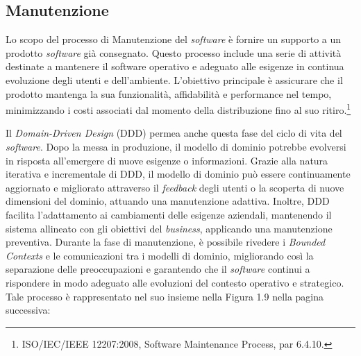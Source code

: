        \subsection{Manutenzione}
        Lo scopo del processo di Manutenzione del \textit{software} è fornire un supporto a un prodotto \textit{software} già consegnato. Questo processo include una serie di attività destinate a mantenere il software operativo e adeguato alle esigenze in continua evoluzione degli utenti e dell'ambiente. L'obiettivo principale è assicurare che il prodotto mantenga la sua funzionalità, affidabilità e performance nel tempo, minimizzando i costi associati dal momento della distribuzione fino al suo ritiro.\footnote{ISO/IEC/IEEE 12207:2008, Software Maintenance Process, par 6.4.10.}

        \vspace{0.2 em}
        \noindent Il \textit{Domain-Driven Design} (DDD) permea anche questa fase del ciclo di vita del \textit{software}. Dopo la messa in produzione, il modello di dominio potrebbe evolversi in risposta all'emergere di nuove esigenze o informazioni. Grazie alla natura iterativa e incrementale di DDD, il modello di dominio può essere continuamente aggiornato e migliorato attraverso il \textit{feedback} degli utenti o la scoperta di nuove dimensioni del dominio, attuando una manutenzione adattiva. Inoltre, DDD facilita l'adattamento ai cambiamenti delle esigenze aziendali, mantenendo il sistema allineato con gli obiettivi del \textit{business}, applicando una manutenzione preventiva. Durante la fase di manutenzione, è possibile rivedere i \textit{Bounded Contexts} e le comunicazioni tra i modelli di dominio, migliorando così la separazione delle preoccupazioni e garantendo che il \textit{software} continui a rispondere in modo adeguato alle evoluzioni del contesto operativo e strategico. Tale processo è rappresentato nel suo insieme nella Figura 1.9 nella pagina successiva:

